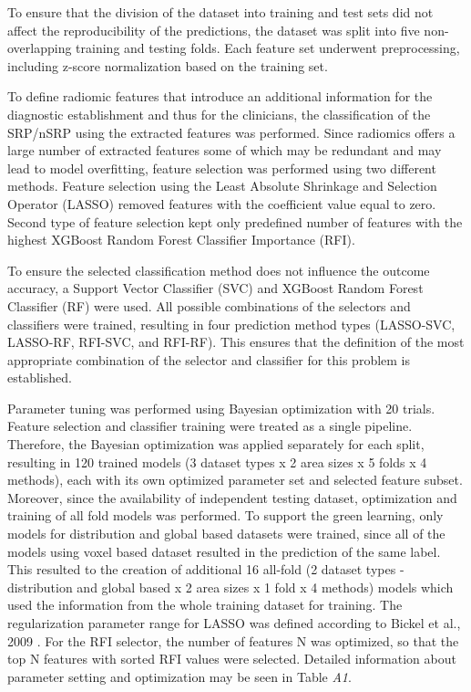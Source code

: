 \documentclass[preprint,12pt]{elsarticle}
\begin{document}
To ensure that the division of the dataset into training and test sets did not affect the reproducibility of the predictions, the dataset was split into five non-overlapping training and testing folds. Each feature set underwent preprocessing, including z-score normalization based on the training set. 

To define radiomic features that introduce an additional information for the diagnostic establishment and thus for the clinicians, the classification of the SRP/nSRP using the extracted features was performed. Since radiomics offers a large number of extracted features some of which may be redundant and may lead to model overfitting, feature selection was performed using two different methods. Feature selection using the Least Absolute Shrinkage and Selection Operator (LASSO) removed features with the coefficient value equal to zero. Second type of feature selection kept only predefined number of features with the highest XGBoost Random Forest Classifier Importance (RFI). 

To ensure the selected classification method does not influence the outcome accuracy, a Support Vector Classifier (SVC) and XGBoost Random Forest Classifier (RF) were used.  All possible combinations of the selectors and classifiers were trained, resulting in four prediction method types (LASSO-SVC, LASSO-RF, RFI-SVC, and RFI-RF). This ensures that the definition of the most appropriate combination of the selector and classifier for this problem is established. 

Parameter tuning was performed using Bayesian optimization with 20 trials. Feature selection and classifier training were treated as a single pipeline. Therefore, the Bayesian optimization was applied separately for each split, resulting in 120 trained models (3 dataset types x 2 area sizes x 5 folds x 4 methods), each with its own optimized parameter set and selected feature subset. Moreover, since the availability of independent testing dataset, optimization and training of all fold models was performed. To support the green learning, only models for distribution and global based datasets were trained, since all of the models using voxel based dataset resulted in the prediction of the same label. This resulted to the creation of additional 16 all-fold (2 dataset types - distribution and global based x 2 area sizes x 1 fold x 4 methods) models which used the information from the whole training dataset for training. The regularization parameter range for LASSO was defined according to Bickel et al., 2009 \cite{Bickel200981}. For the RFI selector, the number of features N was optimized, so that the top N features with sorted RFI values were selected. Detailed information about parameter setting and optimization may be seen in Table \textit{A1}. 
\end{document}
